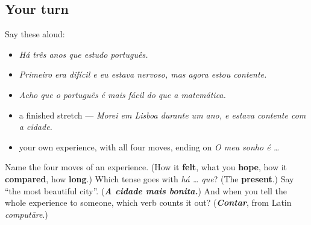 \subsection*{Your turn}
Say these aloud:

\begin{itemize}
\raggedright
  \item \emph{Há três anos que estudo português.}
  \item \emph{Primeiro era difícil e eu estava nervoso, mas agora estou contente.}
  \item \emph{Acho que o português é mais fácil do que a matemática.}
  \item a finished stretch — \emph{Morei em Lisboa durante um ano, e estava contente com a cidade.}
  \item your own experience, with all four moves, ending on \emph{O meu sonho é …}
\end{itemize}

\begin{tcolorbox}[breakable,colback=teal!4,colframe=teal!35!black,title={Before you move on}]
Name the four moves of an experience. (How it \textbf{felt}, what you \textbf{hope}, how it \textbf{compared}, how \textbf{long}.) Which tense goes with \emph{há … que}? (The \textbf{present}.) Say \textquotedblleft{}the most beautiful city\textquotedblright{}. (\emph{\textbf{A cidade mais bonita.}}) And when you tell the whole experience to someone, which verb counts it out? (\emph{\textbf{Contar}}, from Latin \emph{computāre}.)
\end{tcolorbox}
